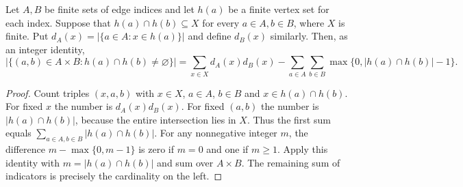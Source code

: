 \begin{lemma}
Let $A,B$ be finite sets of edge indices and let $h(a)$ be a finite vertex
set for each index. Suppose that $h(a)\cap h(b)\subseteq X$ for every
$a\in A,b\in B$, where $X$ is finite. Put
$d_A(x)=|\{a\in A:x\in h(a)\}|$ and define $d_B(x)$ similarly.
Then, as an integer identity,
\[
|\{(a,b)\in A\times B:h(a)\cap h(b)\ne\varnothing\}|
=\sum_{x\in X}d_A(x)d_B(x)
-\sum_{a\in A}\sum_{b\in B}\max\{0,|h(a)\cap h(b)|-1\}.
\]
\end{lemma}
\begin{proof}
Count triples $(x,a,b)$ with $x\in X$, $a\in A$, $b\in B$ and
$x\in h(a)\cap h(b)$. For fixed $x$ the number is $d_A(x)d_B(x)$.
For fixed $(a,b)$ the number is $|h(a)\cap h(b)|$, because the entire
intersection lies in $X$. Thus the first sum equals
$\sum_{a\in A,b\in B}|h(a)\cap h(b)|$.
For any nonnegative integer $m$, the difference $m-\max\{0,m-1\}$
is zero if $m=0$ and one if $m\geq1$. Apply this identity with
$m=|h(a)\cap h(b)|$ and sum over $A\times B$. The remaining sum of
indicators is precisely the cardinality on the left.
\end{proof}
